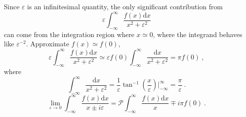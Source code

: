 \documentclass[11pt,a4paper]{article}
\newcommand{\dif}{\mathrm{d}}
\begin{document}
Since $\varepsilon$ is an infinitesimal quantity, the only significant contribution from
\begin{equation}
\varepsilon \int_{-\infty}^\infty \dfrac{ f(x) \dif x}{x^2 +\varepsilon^2} 
\end{equation}
can come from the integration region where $x \simeq 0$, where the integrand behaves like $\varepsilon^{-2}$. Approximate $f(x) \simeq f(0)$, 
\begin{equation}
\varepsilon \int_{-\infty}^\infty \dfrac{ f(x) \dif x}{x^2 +\varepsilon^2} \simeq \varepsilon f(0) \int_{-\infty}^\infty \dfrac{ \dif x}{x^2 +\varepsilon^2} = \pi f(0) ~,
\end{equation}
where
\begin{equation}
\int_{-\infty}^\infty \dfrac{ \dif x}{x^2 +\varepsilon^2} = \dfrac{1}{\varepsilon} \tan^{-1} \left(\dfrac{x}{\varepsilon} \right) \Big|_{-\infty}^\infty = \dfrac{\pi}{\varepsilon} ~.
\end{equation}
\begin{equation}
\lim_{\varepsilon \rightarrow 0} \int_{-\infty}^\infty \dfrac{f(x) \dif x}{x\pm i\varepsilon} = {\mathcal P} \int_{-\infty}^\infty \dfrac{f(x) \dif x}{x} \mp i \pi f(0) ~.
\end{equation}
\end{document}
